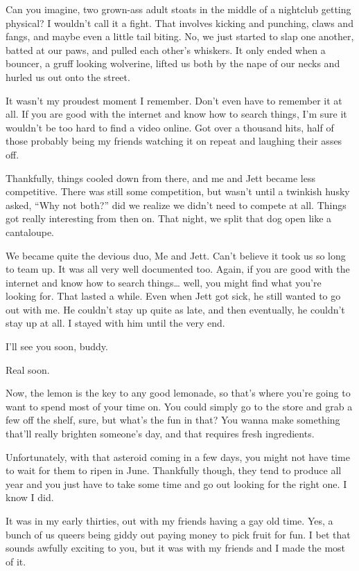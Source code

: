 Can you imagine, two grown-ass adult stoats in the middle of a nightclub
getting physical? I wouldn't call it a fight. That involves kicking and
punching, claws and fangs, and maybe even a little tail biting. No, we
just started to slap one another, batted at our paws, and pulled each
other's whiskers. It only ended when a bouncer, a gruff looking
wolverine, lifted us both by the nape of our necks and hurled us out
onto the street.

It wasn't my proudest moment I remember. Don't even have to remember it
at all. If you are good with the internet and know how to search things,
I'm sure it wouldn't be too hard to find a video online. Got over a
thousand hits, half of those probably being my friends watching it on
repeat and laughing their asses off.

Thankfully, things cooled down from there, and me and Jett became less
competitive. There was still some competition, but wasn't until a
twinkish husky asked, ``Why not both?'' did we realize we didn't need to
compete at all. Things got really interesting from then on. That night,
we split that dog open like a cantaloupe.

We became quite the devious duo, Me and Jett. Can't believe it took us
so long to team up. It was all very well documented too. Again, if you
are good with the internet and know how to search things\ldots{} well,
you might find what you're looking for. That lasted a while. Even when
Jett got sick, he still wanted to go out with me. He couldn't stay up
quite as late, and then eventually, he couldn't stay up at all. I stayed
with him until the very end.

I'll see you soon, buddy.

Real soon.

Now, the lemon is the key to any good lemonade, so that's where you're
going to want to spend most of your time on. You could simply go to the
store and grab a few off the shelf, sure, but what's the fun in that?
You wanna make something that'll really brighten someone's day, and that
requires fresh ingredients.

Unfortunately, with that asteroid coming in a few days, you might not
have time to wait for them to ripen in June. Thankfully though, they
tend to produce all year and you just have to take some time and go out
looking for the right one. I know I did.

It was in my early thirties, out with my friends having a gay old time.
Yes, a bunch of us queers being giddy out paying money to pick fruit for
fun. I bet that sounds awfully exciting to you, but it was with my
friends and I made the most of it.

